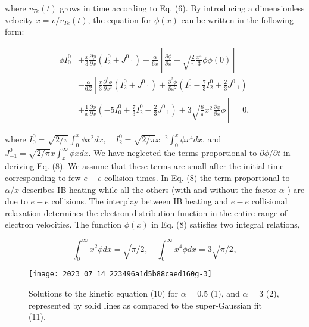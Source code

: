 \documentclass[oneside,onecolumn]{article}
\begin{document}
\begin{sloppypar}
 where $v_{T e}(t)$ grows in time according to Eq. (6). By introducing a dimensionless velocity $x=v / v_{T e}(t)$, the equation for $\phi(x)$ can be written in the following form:
 
 \begin{dmath}[compact]
 \begin{aligned}
 \phi I_{0}^{0} & +\frac{x}{3} \frac{\partial \phi}{\partial x}\left(I_{2}^{0}+J_{-1}^{0}\right)+\frac{\alpha}{6 x}\left[\frac{\partial \phi}{\partial x}+\sqrt{\frac{2}{\pi}} \frac{x^{4}}{3} \phi \phi(0)\right] \\
 & -\frac{\alpha}{6 Z}\left[\frac{x}{3} \frac{\partial^{3} \phi}{\partial x^{3}}\left(I_{2}^{0}+J_{-1}^{0}\right)+\frac{\partial^{2} \phi}{\partial x^{2}}\left(I_{0}^{0}-\frac{7}{3} I_{2}^{0}+\frac{2}{3} J_{-1}^{0}\right)\right. \\
 & \left.+\frac{1}{x} \frac{\partial \phi}{\partial x}\left(-5 I_{0}^{0}+\frac{7}{3} I_{2}^{0}-\frac{2}{3} J_{-1}^{0}\right)+3 \sqrt{\frac{8}{\pi} x^{2}} \frac{\partial \phi}{\partial x} \phi\right]=0,
 \end{aligned}
 \end{dmath}
 
 where $I_{0}^{0}=\sqrt{2 / \pi} \int_{0}^{x} \phi x^{2} d x, \quad I_{2}^{0}=\sqrt{2 / \pi} x^{-2} \int_{0}^{x} \phi x^{4} d x$, and $J_{-1}^{0}=\sqrt{2 / \pi} x \int_{x}^{\infty} \phi x d x$. We have neglected the terms proportional to $\partial \phi / \partial t$ in deriving Eq. (8). We assume that these terms are small after the initial time corresponding to few $e-e$ collision times. In Eq. (8) the term proportional to $\alpha / x$ describes IB heating while all the others (with and without the factor $\alpha$ ) are due to $e-e$ collisions. The interplay between IB heating and $e-e$ collisional relaxation determines the electron distribution function in the entire range of electron velocities. The function $\phi(x)$ in Eq. (8) satisfies two integral relations,
 
 \begin{dmath}[compact]
 \int_{0}^{\infty} x^{2} \phi d x=\sqrt{\pi / 2}, \quad \int_{0}^{\infty} x^{4} \phi d x=3 \sqrt{\pi / 2},
 \end{dmath}
 
 \begin{figure}[tbp]
 	\centering
 	\texttt{[image: 2023\_07\_14\_223496a1d5b88caed160g-3]}
 	\caption{Solutions to the kinetic equation (10) for $\alpha=0.5$ (1), and $\alpha=3$ (2), represented by solid lines as compared to the super-Gaussian fit (11).}
 	\label{fig1.}
 \end{figure}
 

\end{sloppypar}
\end{document}
